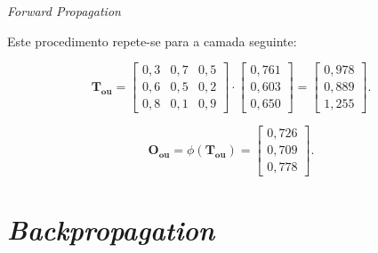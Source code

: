 \begin{frame}[fragile]{\textit{Forward Propagation} \cont}

    Este procedimento repete-se para a camada seguinte:
    
    \begin{figure}
        \centering
        
    \end{figure}
   
    \begin{equation*}
        \mathbf{T_{\text{ou}}} = \begin{bmatrix}
            0,3 & 0,7 & 0,5 \\ 
            0,6 & 0,5 & 0,2 \\ 
            0,8 & 0,1 & 0,9
        \end{bmatrix}
        \cdot
        \begin{bmatrix}
            0,761\\ 
            0,603\\ 
            0,650
        \end{bmatrix}
        =
        \begin{bmatrix}
            0,978\\ 
            0,889\\ 
            1,255
        \end{bmatrix}.
    \end{equation*} 
     
    \begin{equation*}
        \mathbf{O_{\text{ou}}} = \phi (\mathbf{T_{\text{ou}}} )
        = 
        \begin{bmatrix}
            0,726\\ 
            0,709\\ 
            0,778
        \end{bmatrix}.
    \end{equation*}

\end{frame}
  
\section{\textit{Backpropagation}}


